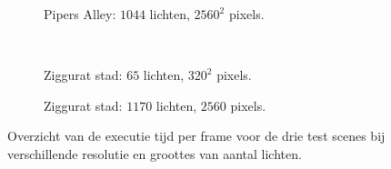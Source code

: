 \begin{figure}[t]
  \begin{adjustbox}{minipage=\textwidth, scale=0.55}
    \begin{subfigure}[b]{0.8\textwidth}
      \centering
      \def\svgwidth{\textwidth}
      
      \caption{Pipers Alley: $1044$ lichten, $2560^2$ pixels.}
      \label{fig:fds-test-frames:alley-high}
    \end{subfigure}
  \end{adjustbox} \\
  \begin{adjustbox}{minipage=\textwidth, scale=0.55}
    \begin{subfigure}[b]{0.8\textwidth}
      \centering
      \def\svgwidth{\textwidth}
      
      \caption{Ziggurat stad: $65$ lichten, $320^2$ pixels.}
      \label{fig:fds-test-frames:city-low}
    \end{subfigure}
  \end{adjustbox}\hspace{-0.075\textwidth} %
  \begin{adjustbox}{minipage=\textwidth, scale=0.55}
    \begin{subfigure}[b]{0.8\textwidth}
      \centering
      \def\svgwidth{\textwidth}
      
      \caption{Ziggurat stad: $1170$ lichten, $2560$ pixels.}
      \label{fig:fds-test-frames:city-high}
    \end{subfigure}
  \end{adjustbox}
  \caption{Overzicht van de executie tijd per frame voor de drie test scenes
           bij verschillende resolutie en groottes van aantal lichten.}
  \label{fig:fds-test-frames}
\end{figure}


